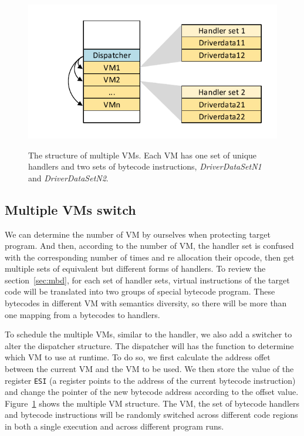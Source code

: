 \documentclass[times]{secauth}
\newcommand\FIXME[1]{\textcolor{red}{FIX:}\textcolor{red}{#1}}
\begin{document}
\begin{figure}[!t]
  \centering
  \includegraphics[width=0.9\columnwidth]{figure/figmvm.pdf}\\
  \caption{The structure of multiple VMs. Each VM has one set of unique handlers and two sets of bytecode instructions, \emph{DriverDataSetN1} and \emph{DriverDataSetN2}.}\label{fig:Fig.4}
\end{figure}


\subsection{Multiple VMs switch}
We can determine the number of VM by ourselves when protecting target program.
And then, according to the number of VM, the handler set is confused with the corresponding number of times
and re allocation their opcode, then get multiple sets of equivalent but different forms of handlers.
To review the section~\ref{sec:mbd}, for each set of handler sets,
virtual instructions of the target code will be translated into two groups of special bytecode program.
These bytecodes in different VM with semantics diversity,
so there will be more than one mapping from a bytecodes to handlers.


To schedule the multiple VMs, similar to the handler, we also add a switcher to alter the dispatcher structure.
The dispatcher will has the function to determine which VM to use at runtime.
To do so, we first calculate the address offet between the current VM and the VM to be used.
We then store the value of the register \texttt{ESI} (a register points to the address of the current bytecode instruction)
and change the pointer of the new bytecode address according to the offset value.
Figure~\ref{fig:Fig.4} shows the multiple VM structure.
The VM, the set of bytecode handlers and bytecode instructions will be randomly switched
across different code regions in both a single execution and across different program runs.
\end{document}
